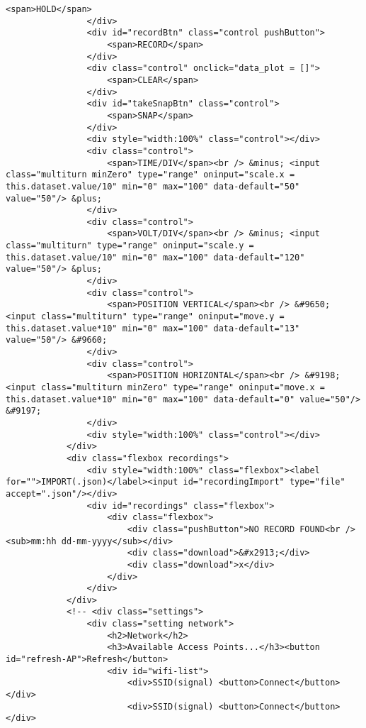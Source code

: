 \begin{lstlisting}[style=htmlcssjs]
                    <span>HOLD</span>
                </div>
                <div id="recordBtn" class="control pushButton">
                    <span>RECORD</span>
                </div>
                <div class="control" onclick="data_plot = []">
                    <span>CLEAR</span>
                </div>
                <div id="takeSnapBtn" class="control">
                    <span>SNAP</span>
                </div>
                <div style="width:100%" class="control"></div>
                <div class="control">
                    <span>TIME/DIV</span><br /> &minus; <input class="multiturn minZero" type="range" oninput="scale.x = this.dataset.value/10" min="0" max="100" data-default="50" value="50"/> &plus;
                </div>
                <div class="control">
                    <span>VOLT/DIV</span><br /> &minus; <input class="multiturn" type="range" oninput="scale.y = this.dataset.value/10" min="0" max="100" data-default="120" value="50"/> &plus;
                </div>
                <div class="control">
                    <span>POSITION VERTICAL</span><br /> &#9650; <input class="multiturn" type="range" oninput="move.y = this.dataset.value*10" min="0" max="100" data-default="13" value="50"/> &#9660;
                </div>
                <div class="control">
                    <span>POSITION HORIZONTAL</span><br /> &#9198; <input class="multiturn minZero" type="range" oninput="move.x = this.dataset.value*10" min="0" max="100" data-default="0" value="50"/> &#9197;
                </div>
                <div style="width:100%" class="control"></div>
            </div>
            <div class="flexbox recordings">
                <div style="width:100%" class="flexbox"><label for="">IMPORT(.json)</label><input id="recordingImport" type="file" accept=".json"/></div>
                <div id="recordings" class="flexbox">
                    <div class="flexbox">
                        <div class="pushButton">NO RECORD FOUND<br /><sub>mm:hh dd-mm-yyyy</sub></div>
                        <div class="download">&#x2913;</div>
                        <div class="download">x</div>
                    </div>
                </div>
            </div>
            <!-- <div class="settings">
                <div class="setting network">
                    <h2>Network</h2>
                    <h3>Available Access Points...</h3><button id="refresh-AP">Refresh</button>
                    <div id="wifi-list">
                        <div>SSID(signal) <button>Connect</button></div>
                        <div>SSID(signal) <button>Connect</button></div>

\end{lstlisting}
